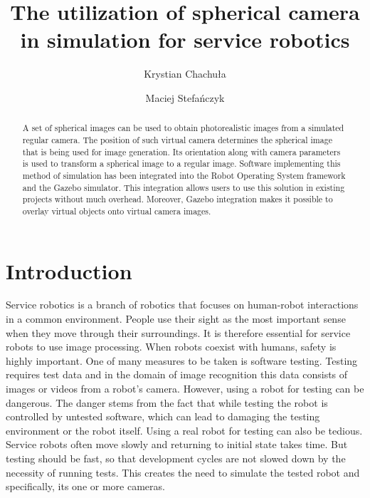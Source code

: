 \documentclass{svproc}
\begin{document}
\mainmatter

\title{The utilization of spherical camera in simulation for service robotics}

\author{Krystian Chachuła \and Maciej Stefańczyk}


\maketitle

\begin{abstract}
A set of spherical images can be used to obtain photorealistic images from a simulated regular camera.
The position of such virtual camera determines the spherical image that is being used for image generation.
Its orientation along with camera parameters is used to transform a spherical image to a regular image.
Software implementing this method of simulation has been integrated into the Robot Operating System framework and the Gazebo simulator. This integration allows users to use this solution in existing projects without much overhead.
Moreover, Gazebo integration makes it possible to overlay virtual objects onto virtual camera images.
\end{abstract}

\section{Introduction}
Service robotics is a branch of robotics that focuses on human-robot interactions in a common environment.
People use their sight as the most important sense when they move through their surroundings.
It is therefore essential for service robots to use image processing.
When robots coexist with humans, safety is highly important. \cite{haddadin2007safety}
One of many measures to be taken is software testing.
Testing requires test data and in the domain of image recognition this data consists of images or videos from a robot's camera. \cite{7759425}
However, using a robot for testing can be dangerous.
The danger stems from the fact that while testing the robot is controlled by untested software, which can lead to damaging the testing environment or the robot itself.
Using a real robot for testing can also be tedious.
Service robots often move slowly and returning to initial state takes time.
But testing should be fast, so that development cycles are not slowed down by the necessity of running tests.
This creates the need to simulate the tested robot and specifically, its one or more cameras.
\end{document}

